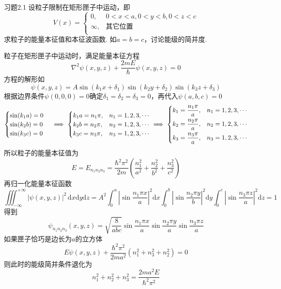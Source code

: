 \begin{question}{习题2.1}
    设粒子限制在矩形匣子中运动，即
    $$
        V(x) = \begin{cases}
            0,      & 0<x<a, 0<y<b, 0<z<c \\
            \infty, & \text{其它位置}         \\
        \end{cases}
    $$
    求粒子的能量本征值和本征波函数. 如$a=b=c$，讨论能级的简并度.
\end{question}
\begin{solution}
    粒子在矩形匣子中运动时，满足能量本征方程
    $$
        \nabla^2\psi(x,y,z) + \frac{2mE}{\hbar}\psi(x,y,z)= 0
    $$
    方程的解形如
    $$
        \psi(x,y,z)=A\sin(k_1x+\delta_1)\sin(k_2y+\delta_2)\sin(k_3z+\delta_3)
    $$
    根据边界条件$\psi(0,0,0)=0$确定$\delta_1=\delta_2=\delta_3=0$，再代入$\psi(a,b,c)=0$
    $$
        \begin{cases}
            \sin(k_1a)=0 \\
            \sin(k_2b)=0 \\
            \sin(k_3c)=0 \\
        \end{cases}
        \implies
        \begin{cases}
            k_1a = n_1\pi, & n_1=1,2,3,\cdots \\
            k_2b = n_2\pi, & n_2=1,2,3,\cdots \\
            k_3c = n_3\pi, & n_3=1,2,3,\cdots \\
        \end{cases}
        \implies
        \begin{dcases}
            k_1=\frac{n_1\pi}{a}, & n_1=1,2,3,\cdots \\
            k_2=\frac{n_2\pi}{a}, & n_2=1,2,3,\cdots \\
            k_3=\frac{n_3\pi}{a}, & n_3=1,2,3,\cdots \\
        \end{dcases}
    $$
    所以粒子的能量本征值为
    $$
        E=E_{n_1n_2n_3}=\frac{\hbar^2\pi^2}{2m}\left(\frac{n_1^2}{a^2}+\frac{n_2^2}{b^2}+\frac{n_3^2}{c^2}\right)
    $$
    再归一化能量本征函数
    $$
        \iiint_{-\infty}^{+\infty}|\psi(x,y,z)|^2\,\mathrm{d}x\mathrm{d}y\mathrm{d}z
        =A^2\int_{0}^{a}\left|\sin\frac{n_1\pi x}{a}\right|^2\mathrm{d}x
        \int_{0}^{b}\left|\sin\frac{n_2\pi y}{b}\right|^2\mathrm{d}y
        \int_{0}^{c}\left|\sin\frac{n_3\pi z}{a}\right|^2\mathrm{d}z
        =1
    $$
    得到
    $$
        \psi_{n_1n_2n_3}(x,y,z) = \sqrt{\frac{8}{abc}}\sin\frac{n_1\pi x}{a}\sin\frac{n_2\pi y}{a}\sin\frac{n_3\pi z}{a}
    $$
    如果匣子恰巧是边长为$a$的立方体
    $$
        E\psi(x,y,z) + \frac{\hbar^2\pi^2}{2ma^2}\left(n_1^2+n_3^2+n_2^2\right) = 0
    $$
    则此时的能级简并条件退化为
    $$
        n_1^2+n_2^2+n_3^2 = \frac{2ma^2E}{\hbar^2\pi^2}
    $$
\end{solution}




